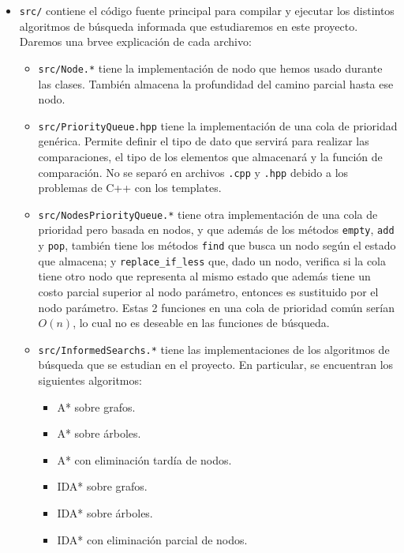 \documentclass[a4paper,10pt]{article}
\begin{document}
\begin{itemize}
    \item \verb|src/| contiene el c\'odigo fuente principal para compilar y ejecutar 
    los distintos algoritmos de b\'usqueda informada que estudiaremos en este proyecto.
    Daremos una brvee explicaci\'on de cada archivo:
    \begin{itemize}
      \item \verb|src/Node.*| tiene la implementaci\'on de nodo que hemos usado durante 
      las clases. Tambi\'en almacena la profundidad del camino parcial hasta ese nodo.

      \item \verb|src/PriorityQueue.hpp| tiene la implementaci\'on de una cola de 
      prioridad gen\'erica. Permite definir el tipo de dato que servir\'a para realizar 
      las comparaciones, el tipo de los elementos que almacenar\'a y la funci\'on de 
      comparaci\'on. No se separ\'o en archivos \verb|.cpp| y \verb|.hpp| debido a los 
      problemas de C++ con los templates.

      \item \verb|src/NodesPriorityQueue.*| tiene otra implementaci\'on de una cola de 
      prioridad pero basada en nodos, y que adem\'as de los m\'etodos 
      \verb|empty|, \verb|add| y \verb|pop|, tambi\'en tiene los m\'etodos \verb|find|
      que busca un nodo seg\'un el estado que almacena; y \verb|replace_if_less| que,
      dado un nodo, verifica si la cola tiene otro nodo que representa al mismo estado
      que adem\'as tiene un costo parcial superior al nodo par\'ametro, entonces es 
      sustituido por el nodo par\'ametro. Estas 2 funciones en una cola de prioridad 
      com\'un ser\'ian $O(n)$, lo cual no es deseable en las funciones de b\'usqueda.

      \item \verb|src/InformedSearchs.*| tiene las implementaciones de los algoritmos
      de b\'usqueda que se estudian en el proyecto. En particular, se encuentran los 
      siguientes algoritmos:
      \begin{itemize}
        \item A* sobre grafos.
        \item A* sobre \'arboles.
        \item A* con eliminaci\'on tard\'ia de nodos.
        \item IDA* sobre grafos.
        \item IDA* sobre \'arboles.
        \item IDA* con eliminaci\'on parcial de nodos.
      \end{itemize}


\end{itemize}
\end{itemize}
\end{document}
